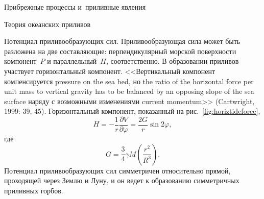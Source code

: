 \begin{chapter}{Прибрежные процессы и~приливные явления}
\begin{section}{Теория океанских приливов}
\begin{paragraph}{Потенциал приливообразующих сил.}
Приливообразующая сила может быть разложена на две составляющие:
перпендикулярный морской поверхности компонент~$P$ и параллельный~$H$,
соответственно. В образовании приливов участвует горизонтальный компонент.
<<Вертикальный компонент компенсируется
pressure on the sea bed, но the ratio of the horizontal
force per unit mass to vertical gravity has to be balanced by an
opposing slope of the sea surface наряду с возможными изменениями
current momentum>> (Cartwright, 1999: 39, 45). 
Горизонтальный компонент, показанный на рис.~\ref{fig:horiztideforce},
\begin{equation}
 H = - \frac{1}{r} \frac{\partial V}{\partial\varphi} 
   = \frac{2 G}{r} \sin 2\varphi,
\end{equation}
где
\begin{equation}
 G = \frac{3}{4} \gamma M \left( \frac{r^{2}}{R^{3}} \right).
\end{equation}
Потенциал приливообразующих сил симметричен относительно прямой, проходящей
через Землю и Луну, и он ведет к образованию симметричных приливных
горбов.
%


\end{paragraph}
\end{section}
\end{chapter}
